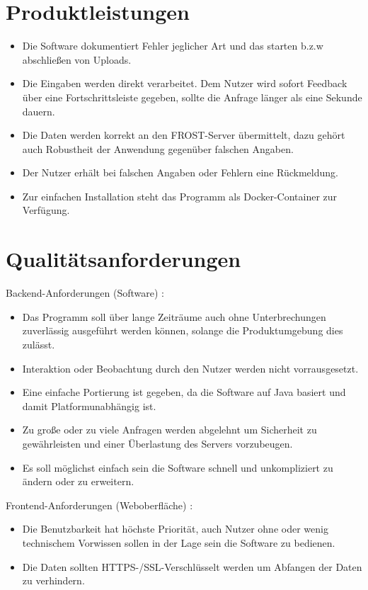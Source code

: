 \documentclass[a4paper, 12 pt]{article}
\begin{document}
	\section{Produktleistungen}
	\begin{itemize}
		\item Die Software dokumentiert Fehler jeglicher Art und das starten b.z.w abschließen von Uploads.
		\item Die Eingaben werden direkt verarbeitet. Dem Nutzer wird sofort Feedback über eine Fortschrittsleiste gegeben, sollte die Anfrage länger als eine Sekunde dauern.
		\item Die Daten werden korrekt an den FROST-Server übermittelt, dazu gehört auch Robustheit der Anwendung gegenüber falschen Angaben.
		\item Der Nutzer erhält bei falschen Angaben oder Fehlern eine Rückmeldung.
		\item Zur einfachen Installation steht das Programm als Docker-Container zur Verfügung.
	\end{itemize}
	
	
	\section{Qualitätsanforderungen}
	Backend-Anforderungen (Software) :
	\begin{itemize}
	\item Das Programm soll über lange Zeiträume auch ohne Unterbrechungen zuverlässig ausgeführt werden können, solange die Produktumgebung dies zulässt.
	\item Interaktion oder Beobachtung durch den Nutzer werden nicht vorrausgesetzt.
	\item Eine einfache Portierung ist gegeben, da die Software auf Java basiert und damit Platformunabhängig ist. 
	\item Zu große oder zu viele Anfragen werden abgelehnt um Sicherheit zu gewährleisten und einer Überlastung des Servers vorzubeugen.
	\item Es soll möglichst einfach sein die Software schnell und unkompliziert zu ändern oder zu erweitern.
	\end{itemize}
	Frontend-Anforderungen (Weboberfläche) :
	\begin{itemize}
	\item Die Benutzbarkeit hat höchste Priorität, auch Nutzer ohne oder wenig technischem Vorwissen sollen in der Lage sein die Software zu bedienen.
	\item Die Daten sollten HTTPS-/SSL-Verschlüsselt werden um Abfangen der Daten zu verhindern.
	\end{itemize}
	
\end{document}
